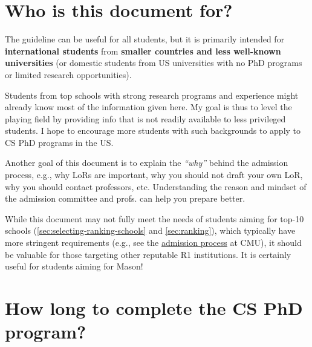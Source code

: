 \documentclass[oneside,11pt,dvipsnames]{book}
\newenvironment{commentbox}[1][]{
  \small
  \begin{mybox}
    {\small \textbf{#1}}
  }{
  \end{mybox}
}
\def\sectioninfo#1{%
  \addcontentsline{toc}{sectioninfo}{%
    \noexpand\numberline{}\color{black}{#1}}%
}
\begin{document}
\section{Who is this document for?}
\sectioninfo{This document is intended for international students from smaller countries and domestic students from less well-known universities.}

The guideline can be useful for all students, but it is primarily intended for \textbf{international students} from \textbf{smaller countries and less well-known universities} (or domestic students from US universities with no PhD programs or limited research opportunities).

Students from top schools with strong research programs and experience might already know most of the information given here.
My goal is thus to level the playing field by providing info that is not readily available to less privileged students. 
I hope to encourage more students with such backgrounds to apply to CS PhD programs in the US.

Another goal of this document is to explain the \emph{``why''} behind the admission process, e.g., why LoRs are important, why you should not draft your own LoR, why you should contact professors, etc. Understanding the reason and mindset of the admission committee and profs. can help you prepare better.

While this document may not fully meet the needs of students aiming for top-10 schools (\autoref{sec:selecting-ranking-schools} and \autoref{sec:ranking}), which typically have more stringent requirements (e.g., see the \href{https://da-data.blogspot.com/2015/03/reflecting-on-cs-graduate-admissions.html}{admission process} at CMU), it should be valuable for those targeting other reputable R1 institutions. It is certainly useful for students aiming for Mason!

  
  
\section{How long to complete the CS PhD program?}\label{sec:time}
\sectioninfo{About 5--7 years in the US.}
\end{document}
